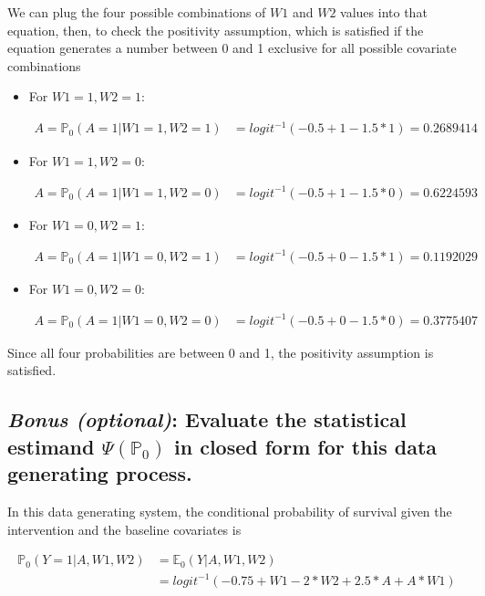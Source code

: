 \documentclass{article}\usepackage[]{graphicx}\usepackage[]{xcolor}
\begin{document}
We can plug the four possible combinations of $W1$ and $W2$ values into that equation, then, to check the positivity assumption, which is satisfied if the equation generates a number between 0 and 1 exclusive for all possible covariate combinations

\begin{itemize}
  
  \item For $W1=1, W2=1$:
  
\begin{align*}
A=\mathbb{P}_0(A=1|W1=1,W2=1) &= logit^{-1}(-0.5+1-1.5*1) = 0.2689414
\end{align*}

  \item For $W1=1, W2=0$:
  
\begin{align*}
A=\mathbb{P}_0(A=1|W1=1,W2=0) &= logit^{-1}(-0.5+1-1.5*0) = 0.6224593
\end{align*}

  \item For $W1=0, W2=1$:
  
\begin{align*}
A=\mathbb{P}_0(A=1|W1=0,W2=1) &= logit^{-1}(-0.5+0-1.5*1) = 0.1192029
\end{align*}

  \item For $W1=0, W2=0$:
  
\begin{align*}
A=\mathbb{P}_0(A=1|W1=0,W2=0) &= logit^{-1}(-0.5+0-1.5*0) = 0.3775407
\end{align*}
  
\end{itemize}

Since all four probabilities are between 0 and 1, the positivity assumption is satisfied.
  
  \subsection{\textit{Bonus (optional)}: Evaluate the statistical estimand $\Psi(\mathbb{P}_0)$ in closed form for this data generating process.}
  

In this data generating system, the conditional probability of survival given the intervention and the baseline covariates is

\begin{align*}
\mathbb{P}_0(Y=1|A,W1,W2) &= \mathbb{E}_0(Y|A,W1,W2) \\
&= logit^{-1}(-0.75+W1-2*W2+2.5*A+A*W1)
\end{align*}
\end{document}
